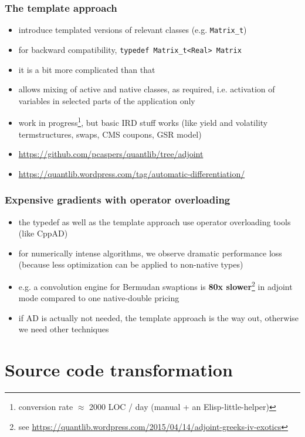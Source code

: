 \documentclass[10pt,German]{beamer}
\begin{document}
\begin{frame}[fragile]
\frametitle{The template approach}
\begin{itemize}
\item introduce templated versions of relevant classes (e.g. \footnotesize\verb+Matrix_t+\normalsize)
\item for backward compatibility, \footnotesize\verb+typedef Matrix_t<Real> Matrix+\normalsize
\item it is a bit more complicated than that
\item allows mixing of active and native classes, as required, i.e. activation of variables in selected parts of the application only
\item work in progress\footnote{conversion rate $\approx$ 2000 LOC / day (manual + an Elisp-little-helper)}, but basic IRD stuff works (like yield and volatility termstructures, swaps, CMS coupons, GSR model)
\item \scriptsize \url{https://github.com/pcaspers/quantlib/tree/adjoint}
\item \scriptsize \url{https://quantlib.wordpress.com/tag/automatic-differentiation/}
\end{itemize}
\end{frame}

\begin{frame}[fragile]
\frametitle{Expensive gradients with operator overloading}
\begin{itemize}
\item the typedef as well as the template approach use operator overloading tools (like CppAD)
\item for numerically intense algorithms, we observe dramatic performance loss (because less optimization can be applied to non-native types)
\item e.g. a convolution engine for Bermudan swaptions is \textbf{80x slower}\footnote{see \tiny\url{https://quantlib.wordpress.com/2015/04/14/adjoint-greeks-iv-exotics}}
in adjoint mode compared to one native-double pricing
\item if AD is actually not needed, the template approach is the way out, otherwise we need other techniques
\end{itemize}
\end{frame}

\section{Source code transformation}
\end{document}
